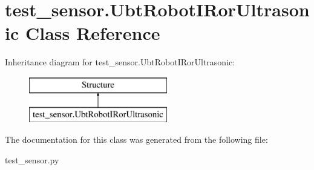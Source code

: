 \hypertarget{classtest__sensor_1_1UbtRobotIRorUltrasonic}{\section{test\+\_\+sensor.\+Ubt\+Robot\+I\+Ror\+Ultrasonic Class Reference}
\label{classtest__sensor_1_1UbtRobotIRorUltrasonic}
}
Inheritance diagram for test\+\_\+sensor.\+Ubt\+Robot\+I\+Ror\+Ultrasonic\+:\begin{figure}[H]
\begin{center}
\leavevmode
\includegraphics[height=2.000000cm]{classtest__sensor_1_1UbtRobotIRorUltrasonic}
\end{center}
\end{figure}


The documentation for this class was generated from the following file\+:\begin{DoxyCompactItemize}
\item 
test\+\_\+sensor.\+py\end{DoxyCompactItemize}
